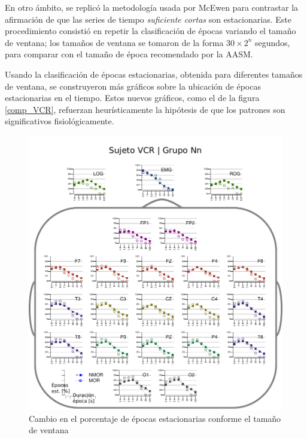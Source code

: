 
En otro ámbito,
se replicó la metodología usada por McEwen \cite{McEwen75} para contrastar la afirmación
de que las series de tiempo \textit{suficiente cortas} son estacionarias. 
Este procedimiento consistió en repetir la clasificación de épocas variando el 
tamaño de ventana; los tamaños de ventana se tomaron de la forma $30 \times 2^{n}$ segundos, 
para comparar con el tamaño de época recomendado por la AASM.%

Usando la clasificación de épocas estacionarias, obtenida para diferentes tamaños de ventana,
se construyeron más gráficos sobre la ubicación de épocas estacionarias en el tiempo. Estos
nuevos
gráficos, como el de la figura \ref{comp_VCR}, refuerzan heurísticamente la hipótesis de que los 
patrones son significativos fisiológicamente. 

\begin{figure}
\centering
\includegraphics[width=.9\linewidth]{./img_resultados/cabeza_VCR.pdf}
\caption{Cambio en el porcentaje de épocas estacionarias conforme el tamaño de ventana}
\label{cabeza_repoio}
\end{figure}

